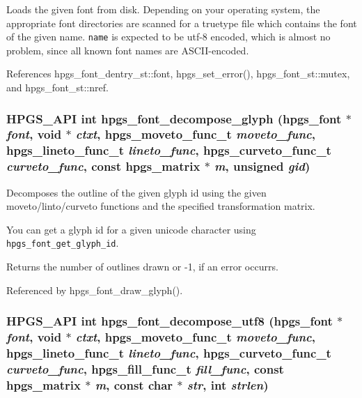 Loads the given font from disk. Depending on your operating system, the appropriate font directories are scanned for a truetype file which contains the font of the given name. {\tt name} is expected to be utf-8 encoded, which is almost no problem, since all known font names are ASCII-encoded. 

References hpgs\_\-font\_\-dentry\_\-st::font, hpgs\_\-set\_\-error(), hpgs\_\-font\_\-st::mutex, and hpgs\_\-font\_\-st::nref.
\subsubsection[hpgs\_\-font\_\-decompose\_\-glyph]{\setlength{\rightskip}{0pt plus 5cm}HPGS\_\-API int hpgs\_\-font\_\-decompose\_\-glyph ({\bf hpgs\_\-font} $\ast$ {\em font}, \/  void $\ast$ {\em ctxt}, \/  hpgs\_\-moveto\_\-func\_\-t {\em moveto\_\-func}, \/  hpgs\_\-lineto\_\-func\_\-t {\em lineto\_\-func}, \/  hpgs\_\-curveto\_\-func\_\-t {\em curveto\_\-func}, \/  const {\bf hpgs\_\-matrix} $\ast$ {\em m}, \/  unsigned {\em gid})}\label{group__font_gf1547131b15cfeae35340ceb6f9f9b02}


Decomposes the outline of the given glyph id using the given moveto/linto/curveto functions and the specified transformation matrix.

You can get a glyph id for a given unicode character using {\tt hpgs\_\-font\_\-get\_\-glyph\_\-id}.

Returns the number of outlines drawn or -1, if an error occurrs. 

Referenced by hpgs\_\-font\_\-draw\_\-glyph().
\subsubsection[hpgs\_\-font\_\-decompose\_\-utf8]{\setlength{\rightskip}{0pt plus 5cm}HPGS\_\-API int hpgs\_\-font\_\-decompose\_\-utf8 ({\bf hpgs\_\-font} $\ast$ {\em font}, \/  void $\ast$ {\em ctxt}, \/  hpgs\_\-moveto\_\-func\_\-t {\em moveto\_\-func}, \/  hpgs\_\-lineto\_\-func\_\-t {\em lineto\_\-func}, \/  hpgs\_\-curveto\_\-func\_\-t {\em curveto\_\-func}, \/  hpgs\_\-fill\_\-func\_\-t {\em fill\_\-func}, \/  const {\bf hpgs\_\-matrix} $\ast$ {\em m}, \/  const char $\ast$ {\em str}, \/  int {\em strlen})}\label{group__font_g45140e6b77db9167a1e48a606147e3e0}


